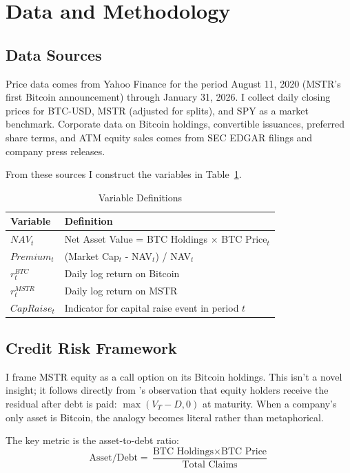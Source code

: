 \section{Data and Methodology}
\label{sec:methodology}

\subsection{Data Sources}

Price data comes from Yahoo Finance for the period August 11, 2020 (MSTR's first Bitcoin announcement) through January 31, 2026. I collect daily closing prices for BTC-USD, MSTR (adjusted for splits), and SPY as a market benchmark. Corporate data on Bitcoin holdings, convertible issuances, preferred share terms, and ATM equity sales comes from SEC EDGAR filings and company press releases.

From these sources I construct the variables in Table~\ref{tab:variables}.

\begin{table}[H]
\centering
\caption{Variable Definitions}
\label{tab:variables}
\begin{tabular}{@{}lp{10cm}@{}}
\toprule
\textbf{Variable} & \textbf{Definition} \\
\midrule
$NAV_t$ & Net Asset Value = BTC Holdings $\times$ BTC Price$_t$ \\
$Premium_t$ & (Market Cap$_t$ - NAV$_t$) / NAV$_t$ \\
$r^{BTC}_t$ & Daily log return on Bitcoin \\
$r^{MSTR}_t$ & Daily log return on MSTR \\
$CapRaise_t$ & Indicator for capital raise event in period $t$ \\
\bottomrule
\end{tabular}
\end{table}

\subsection{Credit Risk Framework}

I frame MSTR equity as a call option on its Bitcoin holdings. This isn't a novel insight; it follows directly from \citet{merton1974pricing}'s observation that equity holders receive the residual after debt is paid: $\max(V_T - D, 0)$ at maturity. When a company's only asset is Bitcoin, the analogy becomes literal rather than metaphorical.

The key metric is the asset-to-debt ratio:
\begin{equation}
    \text{Asset/Debt} = \frac{\text{BTC Holdings} \times \text{BTC Price}}{\text{Total Claims}}
\end{equation}

